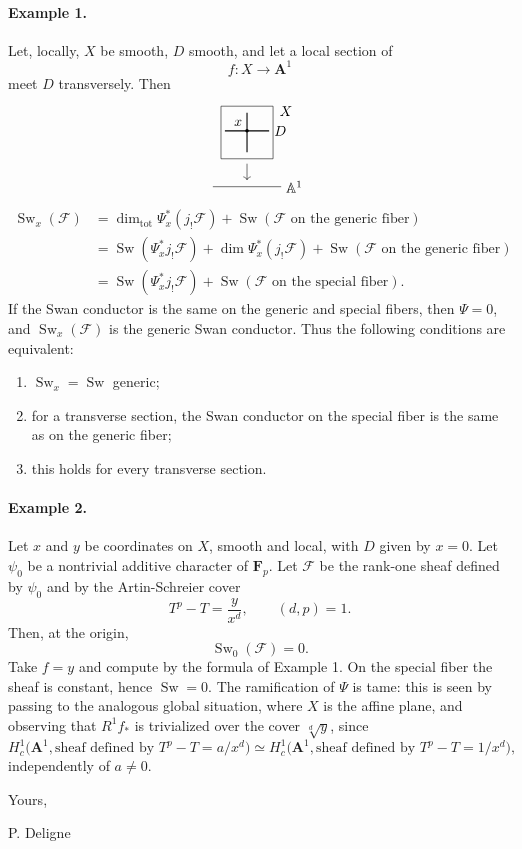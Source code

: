 \documentclass[11pt]{article}
\newcommand{\familySquareSketch}{%
\begin{tikzpicture}[scale=.82,baseline=-.5ex]
  \draw (0,0) rectangle (1.6,1.6);
  \draw[thick] (.12,.85) -- (1.48,.85) node[right]{$D$};
  \draw[thick] (.8,.2) -- (.8,1.4);
  \fill (.8,.85) circle (1.5pt) node[above left]{$x$};
  \draw[->] (.8,-.15) -- (.8,-.65);
  \draw (-.25,-.85) -- (1.85,-.85) node[right]{$\mathbb A^1$};
  \node[right] at (1.65,1.45){$X$};
\end{tikzpicture}%
}
\newcommand{\F}{\mathcal F}
\newcommand{\Fp}{\mathbf F_p}
\newcommand{\A}{\mathbf A}
\DeclareMathOperator{\Sw}{Sw}
\DeclareMathOperator{\Tot}{tot}
\begin{document}
\paragraph{Example 1.}
Let, locally, \(X\) be smooth, \(D\) smooth, and let a local section of
\[
  f:X\longrightarrow \A^1
\]
meet \(D\) transversely. Then
\[
\familySquareSketch
\]
\[
\begin{aligned}
\Sw_x(\F)
&=\dim_{\Tot}\Psi_x^*(j_!\F)
  +\Sw(\F\text{ on the generic fiber}) \\
&=\Sw(\Psi_x^*j_!\F)
  +\dim\Psi_x^*(j_!\F)
  +\Sw(\F\text{ on the generic fiber}) \\
&=\Sw(\Psi_x^*j_!\F)+\Sw(\F\text{ on the special fiber}).
\end{aligned}
\]
If the Swan conductor is the same on the generic and special fibers, then \(\Psi=0\), and \(\Sw_x(\F)\) is the generic Swan conductor. Thus the following conditions are equivalent:
\begin{enumerate}[label=(\roman*)]
\item \(\Sw_x=\Sw\) generic;
\item for a transverse section, the Swan conductor on the special fiber is the same as on the generic fiber;
\item this holds for every transverse section.
\end{enumerate}

\paragraph{Example 2.}
Let \(x\) and \(y\) be coordinates on \(X\), smooth and local, with \(D\) given by \(x=0\). Let \(\psi_0\) be a nontrivial additive character of \(\Fp\). Let \(\F\) be the rank-one sheaf defined by \(\psi_0\) and by the Artin-Schreier cover
\[
  T^p-T=\frac{y}{x^d},
  \qquad (d,p)=1.
\]
Then, at the origin,
\[
  \Sw_0(\F)=0.
\]
Take \(f=y\) and compute by the formula of Example 1. On the special fiber the sheaf is constant, hence \(\Sw=0\). The ramification of \(\Psi\) is tame: this is seen by passing to the analogous global situation, where \(X\) is the affine plane, and observing that \(R^1f_*\) is trivialized over the cover \(\sqrt[d]{y}\), since
\[
 H_c^1\bigl(\A^1,\text{sheaf defined by }T^p-T=a/x^d\bigr)
 \simeq
 H_c^1\bigl(\A^1,\text{sheaf defined by }T^p-T=1/x^d\bigr),
\]
independently of \(a\ne 0\).

Yours,

\hspace{2em}P. Deligne
\end{document}
